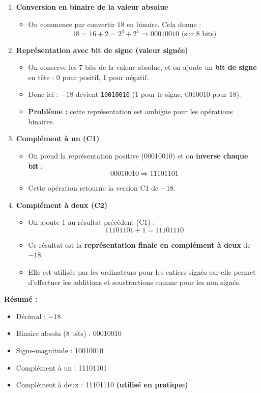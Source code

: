 \documentclass[12pt,a4paper]{article}
\begin{document}
\begin{enumerate}
  \item \textbf{Conversion en binaire de la valeur absolue}
  \begin{itemize}
    \item On commence par convertir $18$ en binaire. Cela donne :
    \[ 18 = 16 + 2 = 2^4 + 2^1 \Rightarrow 00010010 \text{ (sur 8 bits)} \]
  \end{itemize}

  \item \textbf{Représentation avec bit de signe (valeur signée)}
  \begin{itemize}
    \item On conserve les 7 bits de la valeur absolue, et on ajoute un \textbf{bit de signe} en tête : 0 pour positif, 1 pour négatif.
    \item Donc ici : $-18$ devient \texttt{10010010} (1 pour le signe, 0010010 pour $18$).
    \item \textbf{Problème :} cette représentation est ambigüe pour les opérations binaires.
  \end{itemize}

  \item \textbf{Complément à un (C1)}
  \begin{itemize}
    \item On prend la représentation positive (00010010) et on \textbf{inverse chaque bit} :
    \[ 00010010 \Rightarrow 11101101 \]
    \item Cette opération retourne la version C1 de $-18$.
  \end{itemize}

  \item \textbf{Complément à deux (C2)}
  \begin{itemize}
    \item On ajoute 1 au résultat précédent (C1) :
    \[ 11101101 + 1 = 11101110 \]
    \item Ce résultat est la \textbf{représentation finale en complément à deux} de $-18$.
    \item Elle est utilisée par les ordinateurs pour les entiers signés car elle permet d'effectuer les additions et soustractions comme pour les non signés.
  \end{itemize}
\end{enumerate}

\textbf{Résumé :}
\begin{itemize}
  \item Décimal : $-18$
  \item Binaire absolu (8 bits) : 00010010
  \item Signe-magnitude : 10010010
  \item Complément à un : 11101101
  \item Complément à deux : 11101110 \textbf{(utilisé en pratique)}
\end{itemize}
\end{document}
